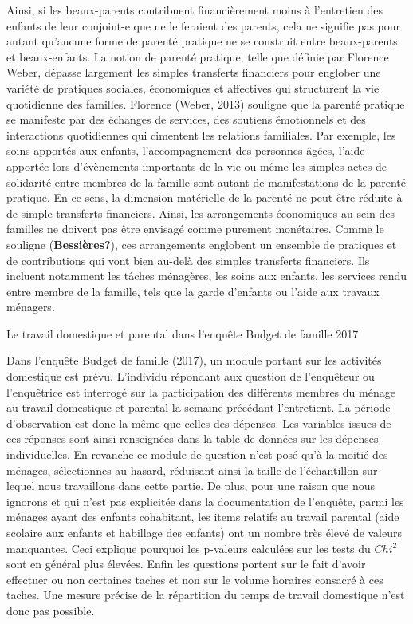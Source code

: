\documentclass[
  12pt,
]{book}
\begin{document}
Ainsi, si les beaux-parents contribuent financièrement moins à
l'entretien des enfants de leur conjoint-e que ne le feraient des
parents, cela ne signifie pas pour autant qu'aucune forme de parenté
pratique ne se construit entre beaux-parents et beaux-enfants. La notion
de parenté pratique, telle que définie par Florence Weber, dépasse
largement les simples transferts financiers pour englober une variété de
pratiques sociales, économiques et affectives qui structurent la vie
quotidienne des familles. Florence (Weber, 2013) souligne que la parenté
pratique se manifeste par des échanges de services, des soutiens
émotionnels et des interactions quotidiennes qui cimentent les relations
familiales. Par exemple, les soins apportés aux enfants,
l'accompagnement des personnes âgées, l'aide apportée lors d'évènements
importants de la vie ou même les simples actes de solidarité entre
membres de la famille sont autant de manifestations de la parenté
pratique. En ce sens, la dimension matérielle de la parenté ne peut être
réduite à de simple transferts financiers. Ainsi, les arrangements
économiques au sein des familles ne doivent pas être envisagé comme
purement monétaires. Comme le souligne (\textbf{Bessières?}), ces
arrangements englobent un ensemble de pratiques et de contributions qui
vont bien au-delà des simples transferts financiers. Ils incluent
notamment les tâches ménagères, les soins aux enfants, les services
rendu entre membre de la famille, tels que la garde d'enfants ou l'aide
aux travaux ménagers.

\begin{encadre}{Le travail domestique et parental dans l'enquête Budget de famille 2017}

Dans l'enquête Budget de famille (2017), un module portant sur les
activités domestique est prévu. L'individu répondant aux question de
l'enquêteur ou l'enquêtrice est interrogé sur la participation des
différents membres du ménage au travail domestique et parental la
semaine précédant l'entretient. La période d’observation est donc la
même que celles des dépenses. Les variables issues de ces réponses sont
ainsi renseignées dans la table de données sur les dépenses
individuelles. En revanche ce module de question n'est posé qu'à la
moitié des ménages, sélectionnes au hasard, réduisant ainsi la taille de
l’échantillon sur lequel nous travaillons dans cette partie. De plus,
pour une raison que nous ignorons et qui n'est pas explicitée dans la
documentation de l'enquête, parmi les ménages ayant des enfants
cohabitant, les items relatifs au travail parental (aide scolaire aux
enfants et habillage des enfants) ont un nombre très élevé de valeurs
manquantes. Ceci explique pourquoi les p-valeurs calculées sur les tests
du $Chi^2$ sont en général plus élevées. Enfin les questions portent sur
le fait d'avoir effectuer ou non certaines taches et non sur le volume
horaires consacré à ces taches. Une mesure précise de la répartition du
temps de travail domestique n'est donc pas possible.

\end{encadre}
\end{document}
